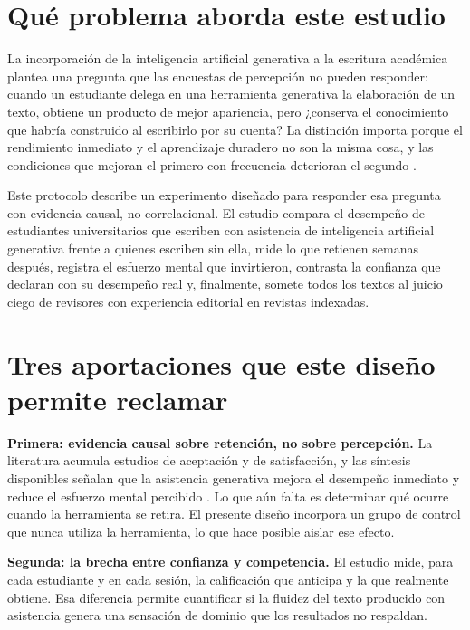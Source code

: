 \documentclass[12pt,a4paper,openany]{report}
\begin{document}
    \section{Qu\'e problema aborda este estudio}
    
    La incorporaci\'on de la inteligencia artificial generativa a la escritura acad\'emica plantea una pregunta que las encuestas de percepci\'on no pueden responder: cuando un estudiante delega en una herramienta generativa la elaboraci\'on de un texto, obtiene un producto de mejor apariencia, pero ¿conserva el conocimiento que habr\'ia construido al escribirlo por su cuenta? La distinci\'on importa porque el rendimiento inmediato y el aprendizaje duradero no son la misma cosa, y las condiciones que mejoran el primero con frecuencia deterioran el segundo \citep{bjork2013self}.
    
    Este protocolo describe un experimento dise\~nado para responder esa pregunta con evidencia causal, no correlacional. El estudio compara el desempe\~no de estudiantes universitarios que escriben con asistencia de inteligencia artificial generativa frente a quienes escriben sin ella, mide lo que retienen semanas despu\'es, registra el esfuerzo mental que invirtieron, contrasta la confianza que declaran con su desempe\~no real y, finalmente, somete todos los textos al juicio ciego de revisores con experiencia editorial en revistas indexadas.
    
    \section{Tres aportaciones que este dise\~no permite reclamar}
    
    \textbf{Primera: evidencia causal sobre retenci\'on, no sobre percepci\'on.} La literatura acumula estudios de aceptaci\'on y de satisfacci\'on, y las s\'intesis disponibles se\~nalan que la asistencia generativa mejora el desempe\~no inmediato y reduce el esfuerzo mental percibido \citep{deng2024chatgpt}. Lo que a\'un falta es determinar qu\'e ocurre cuando la herramienta se retira. El presente dise\~no incorpora un grupo de control que nunca utiliza la herramienta, lo que hace posible aislar ese efecto.
    
    \textbf{Segunda: la brecha entre confianza y competencia.} El estudio mide, para cada estudiante y en cada sesi\'on, la calificaci\'on que anticipa y la que realmente obtiene. Esa diferencia permite cuantificar si la fluidez del texto producido con asistencia genera una sensaci\'on de dominio que los resultados no respaldan.
    
\end{document}
